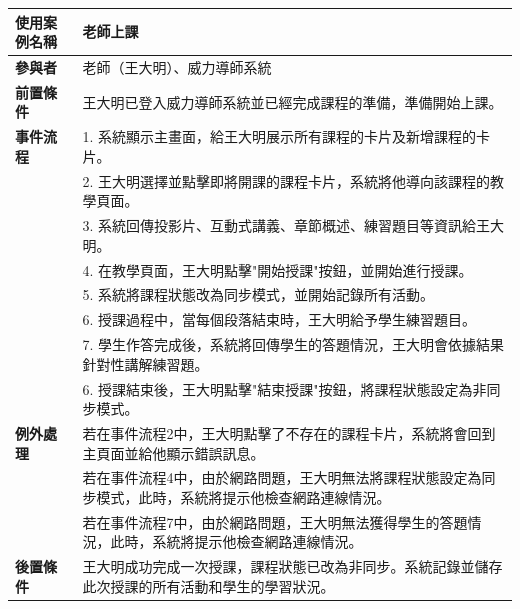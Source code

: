 \documentclass[12pt]{article}
\begin{document}
\begin{longtable}{|l|p{14cm}|}
  \hline
  \textbf{使用案例名稱} & 老師上課 \\ 
  \hline
  \textbf{參與者} & 老師（王大明）、威力導師系統 \\ 
  \hline
  \textbf{前置條件} & 王大明已登入威力導師系統並已經完成課程的準備，準備開始上課。 \\ 
  \hline
  \textbf{事件流程} 
  & 1. 系統顯示主畫面，給王大明展示所有課程的卡片及新增課程的卡片。 \\
  & 2. 王大明選擇並點擊即將開課的課程卡片，系統將他導向該課程的教學頁面。 \\
  & 3. 系統回傳投影片、互動式講義、章節概述、練習題目等資訊給王大明。 \\
  & 4. 在教學頁面，王大明點擊"開始授課"按鈕，並開始進行授課。 \\
  & 5. 系統將課程狀態改為同步模式，並開始記錄所有活動。 \\
  & 6. 授課過程中，當每個段落結束時，王大明給予學生練習題目。 \\
  & 7. 學生作答完成後，系統將回傳學生的答題情況，王大明會依據結果針對性講解練習題。 \\
  & 6. 授課結束後，王大明點擊"結束授課"按鈕，將課程狀態設定為非同步模式。 \\ 
  \hline
  \textbf{例外處理} 
  & 若在事件流程2中，王大明點擊了不存在的課程卡片，系統將會回到主頁面並給他顯示錯誤訊息。 \\
  & 若在事件流程4中，由於網路問題，王大明無法將課程狀態設定為同步模式，此時，系統將提示他檢查網路連線情況。 \\
  & 若在事件流程7中，由於網路問題，王大明無法獲得學生的答題情況，此時，系統將提示他檢查網路連線情況。 \\
  \hline
  \textbf{後置條件} 
  & 王大明成功完成一次授課，課程狀態已改為非同步。系統記錄並儲存此次授課的所有活動和學生的學習狀況。 \\
  \hline
\end{longtable}
\end{document}
